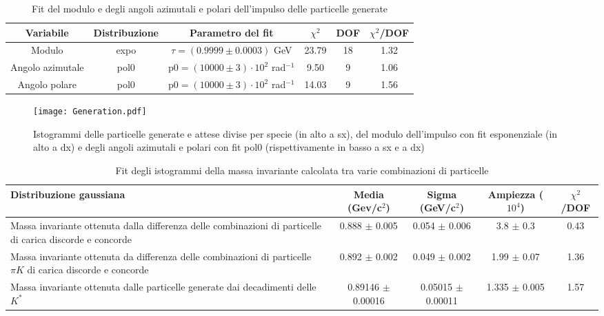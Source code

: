 \documentclass[a4paper,10pt]{article}
\begin{document}
\begin{table}[p]
  \caption{Fit del modulo e degli angoli azimutali e polari dell'impulso delle particelle generate}
  \label{tab:fit}
  \centering
  \begin{tabular}{cccccc}
    \toprule
    Variabile        & Distribuzione & Parametro del fit                                 & $\chi^2$ & DOF & $\chi^2$/DOF \\
    \midrule
    Modulo           & expo          & $\tau=(0.9999 \pm 0.0003)$ GeV                    & 23.79    & 18  & 1.32         \\
    \midrule
    Angolo azimutale & pol0          & $\text{p0} = (10000 \pm 3) \cdot 10^2$ rad$^{-1}$ & 9.50     & 9   & 1.06         \\
    Angolo polare    & pol0          & $\text{p0} = (10000 \pm 3) \cdot 10^2$ rad$^{-1}$ & 14.03    & 9   & 1.56         \\
    \bottomrule
  \end{tabular}
\end{table}

\begin{figure*}[p]
  \centering
  \texttt{[image: Generation.pdf]}
  \caption{Istogrammi delle particelle generate e attese divise per specie (in alto a sx), del modulo dell'impulso con fit esponenziale (in alto a dx) e degli angoli azimutali e polari con fit pol0 (rispettivamente in basso a sx e a dx)}
  \label{fig:Generation}
\end{figure*}

\begin{table*}
  \caption{Fit degli istogrammi della massa invariante calcolata tra varie combinazioni di particelle}
  \label{tab:fitgaus}
  \centering
  \begin{tabular}{p{4.5cm}cccc}
    \toprule
    Distribuzione gaussiana                                                                                        & Media (Gev/c$^2$)     & Sigma (GeV/c$^2$)     & Ampiezza ($10^4$) & $\chi^2$/DOF \\
    \midrule
    Massa invariante ottenuta dalla differenza delle combinazioni di particelle di carica discorde e concorde      & 0.888 $\pm$ 0.005     & 0.054 $\pm$ 0.006     & 3.8 $\pm$ 0.3     & 0.43         \\
    \midrule
    Massa invariante ottenuta da differenza delle combinazioni di particelle $\pi K$ di carica discorde e concorde & 0.892 $\pm$ 0.002     & 0.049 $\pm$ 0.002     & 1.99 $\pm$ 0.07   & 1.36         \\
    \midrule
    Massa invariante ottenuta dalle particelle generate dai decadimenti delle $K^*$                                & 0.89146 $\pm$ 0.00016 & 0.05015 $\pm$ 0.00011 & 1.335 $\pm$ 0.005 & 1.57         \\
    \bottomrule
  \end{tabular}
\end{table*}
\end{document}
